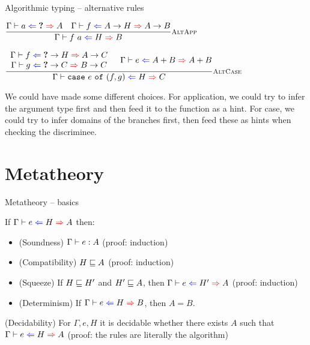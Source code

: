\documentclass{beamer}
\begin{document}
\begin{frame}{Algorithmic typing -- alternative rules}

\begin{center}
  $\infrule[AltApp]{\hinting{a}{\Hole}{A} \quad \hinting{f}{\Fun{A}{H}}{\Fun{A}{B}}}{\hinting{\app{f}{a}}{H}{B}}$

  \vspace{2em}

  $\infrule[AltCase]{\begin{array}{c} \hinting{f}{\Fun{\Hole}{H}}{\Fun{A}{C}} \\ \hinting{g}{\Fun{\Hole}{C}}{\Fun{B}{C}} \end{array} \quad \hinting{e}{\Sum{A}{B}}{\Sum{A}{B}}}{\hinting{\case{e}{f}{g}}{H}{C}}$
\end{center}

\vspace{2em}

We could have made some different choices. For application, we could try to infer the argument type first and then feed it to the function as a hint. For case, we could try to infer domains of the branches first, then feed these as hints when checking the discriminee.

\end{frame}

\section{Metatheory}

\begin{frame}{Metatheory -- basics}

If $\fullhinting{\Gamma}{e}{H}{A}$ then:

\begin{itemize}
  \item (Soundness) $\Gamma \vdash e : A$ (proof: induction)
  \item (Compatibility) $H \sqsubseteq A$ (proof: induction)
  \item (Squeeze) If $H \sqsubseteq H'$ and $H' \sqsubseteq A$, then $\fullhinting{\Gamma}{e}{H'}{A}$ (proof: induction)
  \item (Determinism) If $\hinting{e}{H}{B}$, then $A = B$.
\end{itemize}

\vspace{2em}

(Decidability) For $\Gamma, e, H$ it is decidable whether there exists $A$ such that $\fullhinting{\Gamma}{e}{H}{A}$ (proof: the rules are literally the algorithm)

\end{frame}
\end{document}
